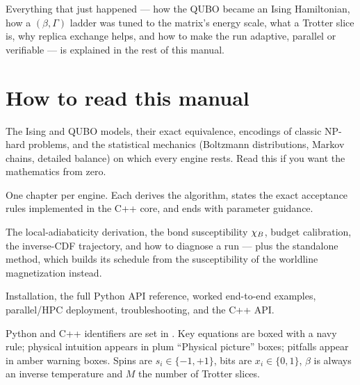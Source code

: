 Everything that just happened --- how the QUBO became an Ising Hamiltonian,
how a $(\beta,\Gamma)$ ladder was tuned to the matrix's energy scale, what a
Trotter slice is, why replica exchange helps, and how to make the run
adaptive, parallel or verifiable --- is explained in the rest of this manual.

\section{How to read this manual}

\begin{description}[style=nextline]
\item[Part I --- Foundations.] The Ising and QUBO models, their exact
equivalence, encodings of classic NP-hard problems, and the statistical
mechanics (Boltzmann distributions, Markov chains, detailed balance) on which
every engine rests. Read this if you want the mathematics from zero.

\item[Part II --- The annealing engines.] One chapter per engine. Each
derives the algorithm, states the exact acceptance rules implemented in the
C++ core, and ends with parameter guidance.

\item[Part III --- Adaptive schedules.] The local-adiabaticity derivation,
the bond susceptibility $\chi_B$, budget calibration, the inverse-CDF
trajectory, and how to diagnose a run --- plus the standalone
 method, which builds its schedule from the susceptibility
of the worldline magnetization instead.

\item[Part IV --- Using the library.] Installation, the full Python API
reference, worked end-to-end examples, parallel/HPC deployment,
troubleshooting, and the C++ API.
\end{description}

\begin{notebox}
Python and C++ identifiers are set in . Key equations are
boxed with a navy rule; physical intuition appears in plum ``Physical
picture'' boxes; pitfalls appear in amber warning boxes. Spins are
$s_i\in\{-1,+1\}$, bits are $x_i\in\{0,1\}$, $\beta$ is always an inverse
temperature and $M$ the number of Trotter slices.
\end{notebox}
